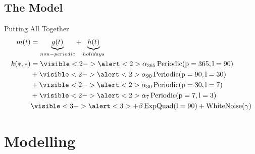 \documentclass{beamer}
\begin{document}
\subsection{The Model}
\begin{frame}{Putting All Together}
\begin{align*}
    m(t) &= \underbrace{g(t)}_{non-periodic} + \underbrace{h(t)}_{holidays}\\
    k(*, *) &= \visible<2->{\alert<2>{\alpha_{365}}}\operatorname{Periodic}(\rp=365, \rl=90)\\
      &+ \visible<2->{\alert<2>{\alpha_{90}}}\operatorname{Periodic}(\rp=90, \rl=30)\\
      &+ \visible<2->{\alert<2>{\alpha_{30}}}\operatorname{Periodic}(\rp=30, \rl=7)\\
      &+ \visible<2->{\alert<2>{\alpha_{7}}}\operatorname{Periodic}(\rp=7, \rl=3)\\
      &\visible<3->{\alert<3>{+ \beta \operatorname{ExpQuad}(\rl=90) +\operatorname{WhiteNoise}(\gamma)}}
\end{align*}
\end{frame}
\section{Modelling}
\end{document}
